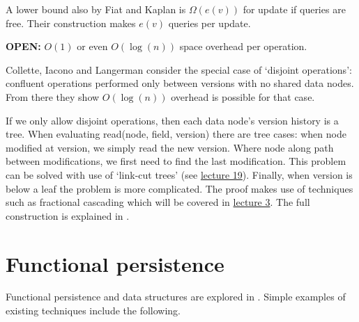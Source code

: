 \documentclass[11pt]{article}
\newcommand{\code}{\ttfamily}
\begin{document}
A lower bound also by Fiat and Kaplan is \(\Omega(e(v))\) for update if queries are free. Their construction makes \(e(v)\) queries per update.

{\bf OPEN:} \( O(1) \) or even \( O(\log{(n)}) \) space overhead per operation.

Collette, Iacono and Langerman consider the special case of `disjoint operations': confluent operations performed only between versions with no shared data nodes. From there they show \( O(\log{(n)})\) overhead is possible for that case.

If we only allow disjoint operations, then each data node's version history is a tree. When evaluating  {\code read(node, field, version)} there are tree cases: when node modified at {\code version}, we simply read the new version. Where node along path between modifications, we first need to find the last modification. This problem can be solved with use of `link-cut trees' (see  \href{http://courses.csail.mit.edu/6.851/spring12/lectures/L19.html}{lecture 19}). Finally,  when {\code version} is below a leaf the problem is more complicated.  The proof makes use of techniques such as fractional cascading which will be covered in \href{http://courses.csail.mit.edu/6.851/spring12/lectures/L03.html}{lecture 3}.  The full construction is explained in \cite{collette}.

\section{Functional persistence}
Functional persistence and data structures are explored in \cite{okasaki}.  Simple examples of existing techniques include the following.
\end{document}
